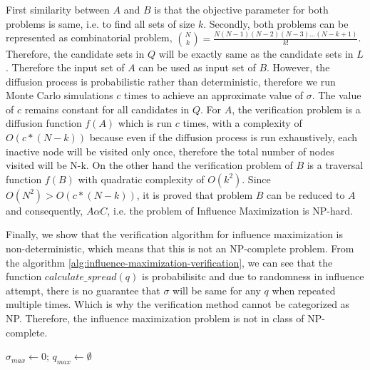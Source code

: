 	First similarity between $A$ and $B$ is that the objective parameter for both problems is same, i.e. to find all sets of size $k$. Secondly, both problems can be represented as combinatorial problem, ${N\choose k}=\frac{N(N-1)(N-2)(N-3)...(N-k+1)}{k!}$. Therefore, the candidate sets in $Q$ will be exactly same as the candidate sets in $L$. Therefore the input set of $A$ can be used as input set of $B$. However, the diffusion process is probabilistic rather than deterministic, therefore we run Monte Carlo simulations $c$ times to achieve an approximate value of $\sigma$. The value of $c$ remains constant for all candidates in $Q$. For $A$, the verification problem is a diffusion function $f(A)$ which is run $c$ times, with a complexity of $O(c*(N-k))$ because even if the diffusion process is run exhaustively, each inactive node will be visited only once, therefore the total number of nodes visited will be N-k. On the other hand the verification problem of $B$ is a traversal function $f(B)$ with quadratic complexity of $O(k^2)$. Since $O(N^2) > O(c*(N-k))$, it is proved that problem $B$ can be reduced to $A$ and consequently, $A \alpha C$, i.e. the problem of Influence Maximization is NP-hard.

	Finally, we show that the verification algorithm for influence maximization is non-deterministic, which means that this is not an NP-complete problem. From the algorithm \ref{alg:influence-maximization-verification}, we can see that the function $calculate\_spread(q)$ is probabilisitc and due to randomness in influence attempt, there is no guarantee that $\sigma$ will be same for any $q$ when repeated multiple times. Which is why the verification method cannot be categorized as NP. Therefore, the influence maximization problem is not in class of NP-complete.
	
	\begin{algorithm}[h]
		\caption{Non-deterministic algorithm for optimal solution verification of influence maximization problem}
		\label{alg:influence-maximization-verification}
		\SetAlgoLined
		$\sigma_{max} \gets 0$; $q_{max} \gets \emptyset$
		\newline
	\end{algorithm}
	

